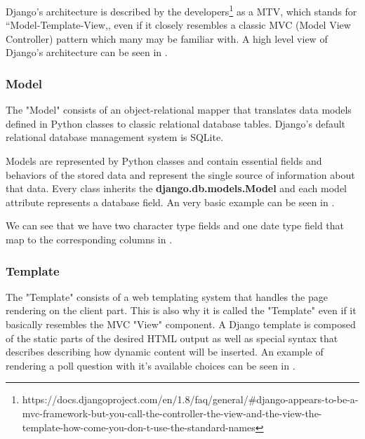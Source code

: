 Django's architecture is described by the developers\footnote{https://docs.djangoproject.com/en/1.8/faq/general/\#django-appears-to-be-a-mvc-framework-but-you-call-the-controller-the-view-and-the-view-the-template-how-come-you-don-t-use-the-standard-names\label{note1}} as a MTV, which stands for ``Model-Template-View,, even if it closely resembles a classic MVC (Model View Controller) pattern which many may be familiar with. A high level view of Django's architecture can be seen in .


\subsubsection{Model}
\label{sub-sub-sec:model}

The "Model" consists of an object-relational mapper that translates data models defined in Python classes to classic relational database tables. Django's default relational database management system is SQLite.

Models are represented by Python classes and contain essential fields and behaviors of the stored data and represent the single source of information about that data. Every class inherits the \textbf{django.db.models.Model} and each model attribute represents a database field. An very basic example can be seen in .



We can see that we have two character type fields and one date type field that map to the corresponding columns in .



\subsubsection{Template}
\label{sub-sub-sec:template}

The "Template" consists of a web templating system that handles the page rendering on the client part. This is also why it is called the "Template" even if it basically resembles the MVC "View" component. A Django template is composed of the static parts of the desired HTML output as well as special syntax that describes describing how dynamic content will be inserted. An example of rendering a poll question with it's available choices can be seen in .

